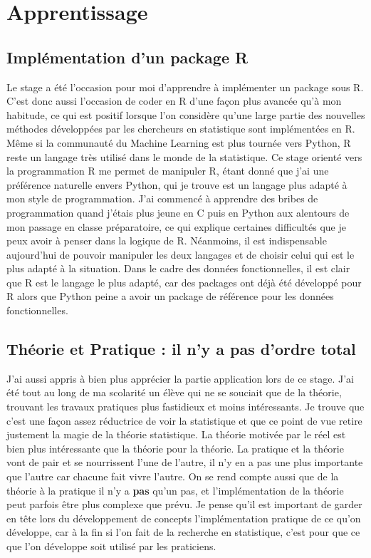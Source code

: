 
\section{Apprentissage}

\subsection{Implémentation d'un package R}

Le stage a été l'occasion pour moi d'apprendre à implémenter un package sous R. C'est donc aussi l'occasion de coder en R d'une façon plus avancée qu'à mon habitude, ce qui est positif lorsque l'on considère qu'une large partie des nouvelles méthodes développées par les chercheurs en statistique sont implémentées en R. Même si la communauté du Machine Learning est plus tournée vers Python, R reste un langage très utilisé dans le monde de la statistique. Ce stage orienté vers la programmation R me permet de manipuler R, étant donné que j'ai une préférence naturelle envers Python, qui je trouve est un langage plus adapté à mon style de programmation. J'ai commencé à apprendre des bribes de programmation quand j'étais plus jeune en C puis en Python aux alentours de mon passage en classe préparatoire, ce qui explique certaines difficultés que je peux avoir à penser dans la logique de R. Néanmoins, il est indispensable aujourd'hui de pouvoir manipuler les deux langages et de choisir celui qui est le plus adapté à la situation. Dans le cadre des données fonctionnelles, il est clair que R est le langage le plus adapté, car des packages ont déjà été développé pour R alors que Python peine a avoir un package de référence pour les données fonctionnelles.

\subsection{Théorie et Pratique : il n'y a pas d'ordre total}

J'ai aussi appris à bien plus apprécier la partie application lors de ce stage. J'ai été tout au long de ma scolarité un élève qui ne se souciait que de la théorie, trouvant les travaux pratiques plus fastidieux et moins intéressants. Je trouve que c'est une façon assez réductrice de voir la statistique et que ce point de vue retire justement la magie de la théorie statistique. La théorie motivée par le réel est bien plus intéressante que la théorie pour la théorie. La pratique et la théorie vont de pair et se nourrissent l'une de l'autre, il n'y en a pas une plus importante que l'autre car chacune fait vivre l'autre. On se rend compte aussi que de la théorie à la pratique il n'y a \textbf{pas} qu'un pas, et l'implémentation de la théorie peut parfois être plus complexe que prévu. Je pense qu'il est important de garder en tête lors du développement de concepts l'implémentation pratique de ce qu'on développe, car à la fin si l'on fait de la recherche en statistique, c'est pour que ce que l'on développe soit utilisé par les praticiens.

